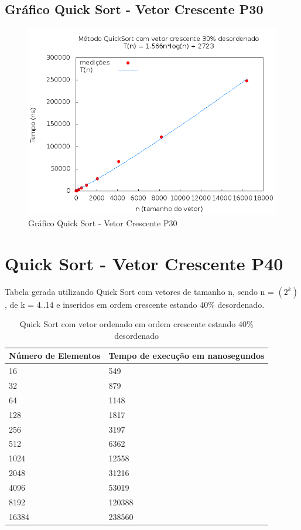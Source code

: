 \documentclass[12pt,a4paper,twoside]{report}
\begin{document}
\subsection{Gráfico Quick Sort - Vetor Crescente P30}
\begin{figure}[H]
    \centering
    \includegraphics[width=0.7\linewidth]{graficos/QuickSort/vIntCrescenteP30/vIntCrescenteP30.png}
  \caption{Gráfico Quick Sort - Vetor Crescente P30}
\end{figure}

\section{Quick Sort - Vetor Crescente P40}
Tabela gerada utilizando Quick Sort com vetores de tamanho n, sendo n = $(2^k)$, de k = 4..14 e inseridos em ordem crescente estando 40\% desordenado.
\begin{table}[H]
\centering
\caption{Quick Sort com vetor ordenado em ordem crescente estando 40\% desordenado}
\label{my-label}
\begin{tabular}{|l|l|}
\hline
\multicolumn{1}{|c|}{\textbf{Número de Elementos}} & \multicolumn{1}{c|}{\textbf{Tempo de execução em nanosegundos}} \\ \hline
16 & 549 \\ \hline
32 & 879 \\ \hline
64 & 1148 \\ \hline
128 & 1817 \\ \hline
256 & 3197 \\ \hline
512 & 6362 \\ \hline
1024 & 12558 \\ \hline
2048 & 31216 \\ \hline
4096 & 53019 \\ \hline
8192 & 120388 \\ \hline
16384 & 238560 \\ \hline
\end{tabular}
\end{table}
\end{document}
